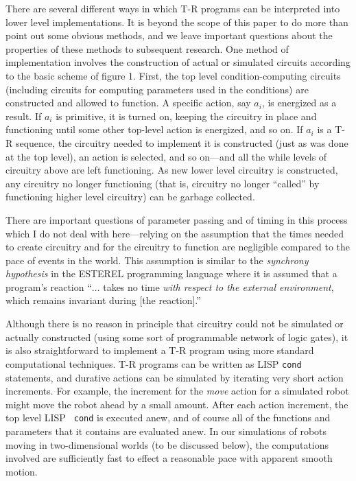 There are several different ways in which T-R programs can be interpreted  
into lower level implementations.  It is beyond the scope of this paper to do  
more than point out some obvious methods, and we leave important questions  
about the properties of these methods to subsequent research.  One method of  
implementation involves the construction of actual or simulated circuits  
according to the basic scheme of figure 1.  First, the top level  
condition-computing circuits (including circuits for computing parameters  
used in the conditions) are constructed and allowed to function.  A specific  
action, say $a_i$, is energized as a result.  If $a_i$ is primitive, it is  
turned on, keeping the circuitry in place and functioning until some other  
top-level action is energized, and so on.  If $a_i$ is a T-R sequence, the  
circuitry needed to implement it is constructed (just as was done at the top  
level), an action is selected, and so on---and all the while levels of  
circuitry above are left functioning.  As new lower level circuitry is  
constructed, any circuitry no longer functioning (that is, circuitry no  
longer ``called'' by functioning higher level circuitry) can be garbage  
collected.

There are  important questions of parameter passing and of timing in this  
process which I do not deal with here---relying on the assumption that the  
times needed to create circuitry and for the circuitry to function are  
negligible compared to the pace of events in the world.   This assumption is  
similar to the {\it synchrony hypothesis} in the {\small ESTEREL} programming  
language \cite{Berry} where it is assumed that a program's reaction   
``$\ldots $ takes no time {\it with respect to the external environment},  
which remains invariant during [the reaction].''

Although there is no reason in principle that circuitry could not be  
simulated or actually constructed (using some sort of programmable network of  
logic gates), it is also straightforward to implement a T-R program using  
more standard computational techniques.  T-R programs can be written as  
{\small LISP} {\tt cond} statements,  and durative actions can be simulated  
by iterating very short action increments.  For example, the increment for  
the {\it move} action for a simulated robot might move the robot ahead by a  
small amount. After each action increment, the top level {\small LISP} {\tt  
cond} is executed anew, and of course all of the functions and parameters  
that it contains are evaluated anew.  In our  simulations of robots moving in  
two-dimensional worlds (to be discussed below), the computations involved are  
sufficiently fast to effect a reasonable pace with apparent smooth motion.

